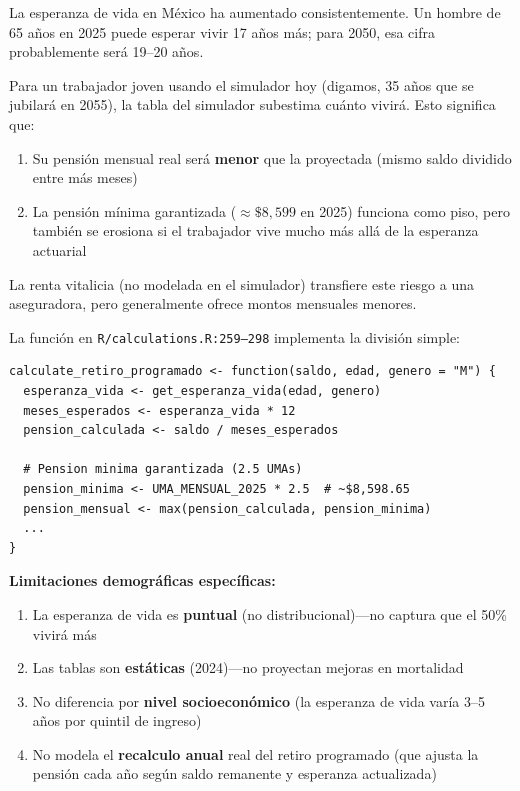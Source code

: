 \documentclass[11pt,a4paper]{report}
\begin{document}
\begin{tcolorbox}[colback=green!5!white, colframe=green!50!black, title=\textbf{Intuici\'on: Vivir M\'as es Bueno... Pero Caro}]
La esperanza de vida en M\'exico ha aumentado consistentemente. Un hombre de 65 a\~nos en 2025 puede esperar vivir 17 a\~nos m\'as; para 2050, esa cifra probablemente ser\'a 19--20 a\~nos.

Para un trabajador joven usando el simulador hoy (digamos, 35 a\~nos que se jubilar\'a en 2055), la tabla del simulador subestima cu\'anto vivir\'a. Esto significa que:
\begin{enumerate}
  \item Su pensi\'on mensual real ser\'a \textbf{menor} que la proyectada (mismo saldo dividido entre m\'as meses)
  \item La pensi\'on m\'inima garantizada ($\approx\$8,599$ en 2025) funciona como piso, pero tambi\'en se erosiona si el trabajador vive mucho m\'as all\'a de la esperanza actuarial
\end{enumerate}

La renta vitalicia (no modelada en el simulador) transfiere este riesgo a una aseguradora, pero generalmente ofrece montos mensuales menores.
\end{tcolorbox}

\begin{tcolorbox}[colback=orange!5!white, colframe=orange!75!black, title=\textbf{Aplicaci\'on en C\'odigo: calculate\_retiro\_programado()}, breakable]
La funci\'on en \texttt{R/calculations.R:259--298} implementa la divisi\'on simple:

\begin{lstlisting}[caption={Retiro programado simplificado}]
calculate_retiro_programado <- function(saldo, edad, genero = "M") {
  esperanza_vida <- get_esperanza_vida(edad, genero)
  meses_esperados <- esperanza_vida * 12
  pension_calculada <- saldo / meses_esperados

  # Pension minima garantizada (2.5 UMAs)
  pension_minima <- UMA_MENSUAL_2025 * 2.5  # ~$8,598.65
  pension_mensual <- max(pension_calculada, pension_minima)
  ...
}
\end{lstlisting}

\textbf{Limitaciones demogr\'aficas espec\'ificas:}
\begin{enumerate}
  \item La esperanza de vida es \textbf{puntual} (no distribucional)---no captura que el 50\% vivir\'a m\'as
  \item Las tablas son \textbf{est\'aticas} (2024)---no proyectan mejoras en mortalidad
  \item No diferencia por \textbf{nivel socioecon\'omico} (la esperanza de vida var\'ia 3--5 a\~nos por quintil de ingreso)
  \item No modela el \textbf{recalculo anual} real del retiro programado (que ajusta la pensi\'on cada a\~no seg\'un saldo remanente y esperanza actualizada)
\end{enumerate}
\end{tcolorbox}
\end{document}
